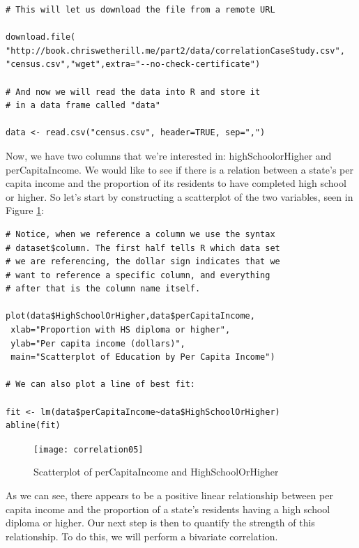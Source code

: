 \begin{framed}
\begin{Verbatim}[samepage=TRUE]
# This will let us download the file from a remote URL

download.file(
"http://book.chriswetherill.me/part2/data/correlationCaseStudy.csv",
"census.csv","wget",extra="--no-check-certificate")

# And now we will read the data into R and store it
# in a data frame called "data"

data <- read.csv("census.csv", header=TRUE, sep=",")
\end{Verbatim}
\end{framed}

Now, we have two columns that we're interested in: highSchoolorHigher and perCapitaIncome. We would like to see if there is a relation between a state's per capita income and the proportion of its residents to have completed high school or higher. So let's start by constructing a scatterplot of the two variables, seen in Figure \ref{fig:correlation05}:

\begin{framed}
\begin{Verbatim}[samepage=TRUE]
# Notice, when we reference a column we use the syntax
# dataset$column. The first half tells R which data set
# we are referencing, the dollar sign indicates that we
# want to reference a specific column, and everything
# after that is the column name itself.

plot(data$HighSchoolOrHigher,data$perCapitaIncome,
 xlab="Proportion with HS diploma or higher",
 ylab="Per capita income (dollars)",
 main="Scatterplot of Education by Per Capita Income")

# We can also plot a line of best fit:

fit <- lm(data$perCapitaIncome~data$HighSchoolOrHigher)
abline(fit)
\end{Verbatim}
\end{framed}

\begin{figure}[h]
\texttt{[image: correlation05]}
\label{fig:correlation05}
\caption{Scatterplot of perCapitaIncome and HighSchoolOrHigher}
\end{figure}
As we can see, there appears to be a positive linear relationship between per capita income and the proportion of a state's residents having a high school diploma or higher. Our next step is then to quantify the strength of this relationship. To do this, we will perform a bivariate correlation.

